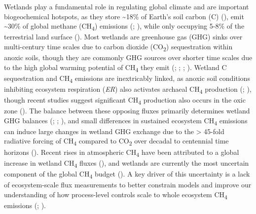 \documentclass[
  12pt,
]{article}
\begin{document}
Wetlands play a fundamental role in regulating global climate and are
important biogeochemical hotspots, as they store \textasciitilde18\% of
Earth's soil carbon (C) (),
emit \textasciitilde30\% of global methane (CH\textsubscript{4})
emissions (; ),
while only occupying 5-8\% of the terrestrial land surface
(). Most
wetlands are greenhouse gas (GHG) sinks over multi-century time scales
due to carbon dioxide (CO\textsubscript{2}) sequestration within anoxic
soils, though they are commonly GHG sources over shorter time scales due
to the high global warming potential of CH\textsubscript{4} they emit
(;
;
;
).
Wetland C sequestration and CH\textsubscript{4} emissions are
inextricably linked, as anoxic soil conditions inhibiting ecosystem
respiration (\emph{ER}) also activates archaeal CH\textsubscript{4}
production (;
), though recent studies
suggest significant CH\textsubscript{4} production also occurs in the
oxic zone (). The balance between these opposing fluxes primarily determines
wetland GHG balances (; ; ), and small differences in sustained ecosystem CH\textsubscript{4}
emissions can induce large changes in wetland GHG exchange due to the
\textgreater{} 45-fold radiative forcing of CH\textsubscript{4} compared
to CO\textsubscript{2} over decadal to centennial time horizons
().
Recent rises in atmospheric CH\textsubscript{4} have been attributed to
a global increase in wetland CH\textsubscript{4} fluxes
(), and
wetlands are currently the most uncertain component of the global
CH\textsubscript{4} budget (). A key driver of this uncertainty is a lack of
ecosystem-scale flux measurements to better constrain models and improve
our understanding of how process-level controls scale to whole ecosystem
CH\textsubscript{4} emissions
(;
).
\end{document}
